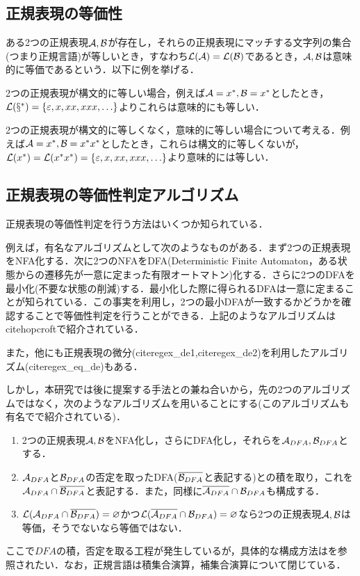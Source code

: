 \documentclass[a4paper, 12pt, dvipdfmx, uplatex]{jsreport}
\begin{document}
\subsection{正規表現の等価性}
ある2つの正規表現$\mathcal{A},\mathcal{B}$が存在し，それらの正規表現にマッチする文字列の集合(つまり正規言語)が等しいとき，すなわち$\mathcal{L(A)}=\mathcal{L(B)}$であるとき，$\mathcal{A},\mathcal{B}$は意味的に等価であるという．以下に例を挙げる．

2つの正規表現が構文的に等しい場合，例えば$\mathcal{A}=x^*,\mathcal{B}=x^*$としたとき，$\mathcal{L(x^*)}=\qty{\varepsilon,x,xx,xxx,\ldots}$よりこれらは意味的にも等しい．

2つの正規表現が構文的に等しくなく，意味的に等しい場合について考える．例えば$\mathcal{A}=x^*,\mathcal{B}=x^*x^*$としたとき，これらは構文的に等しくないが，$\mathcal{L}(x^*)=\mathcal{L}(x^*x^*)=\qty{\varepsilon,x,xx,xxx,\ldots}$より意味的には等しい．

\subsection{正規表現の等価性判定アルゴリズム}
正規表現の等価性判定を行う方法はいくつか知られている．

例えば，有名なアルゴリズムとして次のようなものがある．まず2つの正規表現をNFA化する．次に2つのNFAをDFA(Deterministic Finite Automaton，ある状態からの遷移先が一意に定まった有限オートマトン)化する．さらに2つのDFAを最小化(不要な状態の削減)する．最小化した際に得られるDFAは一意に定まることが知られている．この事実を利用し，2つの最小DFAが一致するかどうかを確認することで等価性判定を行うことができる．上記のようなアルゴリズムはcite{hopcroft}で紹介されている．

また，他にも正規表現の微分(cite{regex_de1},cite{regex_de2})を利用したアルゴリズム(cite{regex_eq_de})もある．

しかし，本研究では後に提案する手法との兼ね合いから，先の2つのアルゴリズムではなく，次のようなアルゴリズムを用いることにする(このアルゴリズムも有名で\cite{sipser}で紹介されている)．

\begin{enumerate}
  \item 2つの正規表現$\mathcal{A},\mathcal{B}$をNFA化し，さらにDFA化し，それらを$\mathcal{A}_{DFA},\mathcal{B}_{DFA}$とする．
  \item $\mathcal{A}_{DFA}$と$\mathcal{B}_{DFA}$の否定を取ったDFA($\overline{\mathcal{B}_{DFA}}$と表記する)との積を取り，これを$\mathcal{A}_{DFA}\cap\overline{\mathcal{B}_{DFA}}$と表記する．また，同様に$\overline{\mathcal{A}_{DFA}}\cap\mathcal{B}_{DFA}$も構成する．
  \item $\mathcal{L}(\mathcal{A}_{DFA}\cap\overline{\mathcal{B}_{DFA}})=\varnothing$かつ$\mathcal{L}(\overline{\mathcal{A}_{DFA}}\cap\mathcal{B}_{DFA})=\varnothing$なら2つの正規表現$\mathcal{A},\mathcal{B}$は等価，そうでないなら等価ではない．
\end{enumerate}

ここで$DFA$の積，否定を取る工程が発生しているが，具体的な構成方法は\cite{sipser}を参照されたい．なお，正規言語は積集合演算，補集合演算について閉じている．













\end{document}
